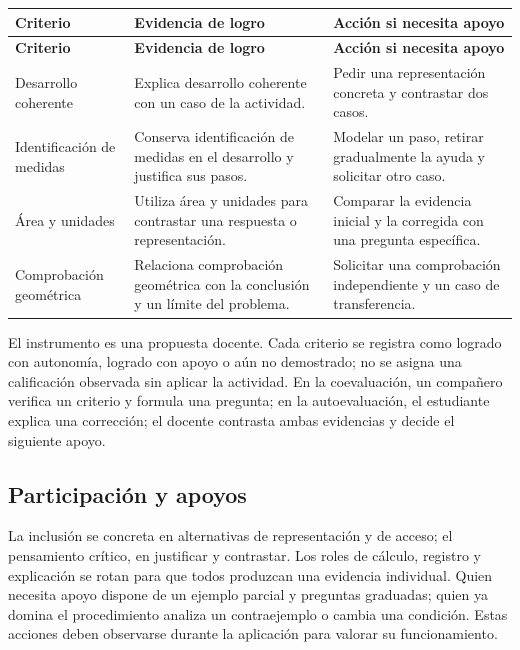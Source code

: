 \documentclass[spanish,letterpaper,oneside]{article}
\begin{document}
{\small{}\renewcommand{\arraystretch}{1.25}
\begin{longtable}{|>{\raggedright\arraybackslash}p{}|>{\raggedright\arraybackslash}p{}|>{\raggedright\arraybackslash}p{}|}\hline
\rowcolor{iiiepePale} \textbf{Criterio} & \textbf{Evidencia de logro} & \textbf{Acción si necesita apoyo} \\\hline
\endfirsthead
\hline
\rowcolor{iiiepePale} \textbf{Criterio} & \textbf{Evidencia de logro} & \textbf{Acción si necesita apoyo} \\\hline
\endhead
Desarrollo coherente & Explica desarrollo coherente con un caso de la actividad. & Pedir una representación concreta y contrastar dos casos. \\\hline
Identificación de medidas & Conserva identificación de medidas en el desarrollo y justifica sus pasos. & Modelar un paso, retirar gradualmente la ayuda y solicitar otro caso. \\\hline
Área y unidades & Utiliza área y unidades para contrastar una respuesta o representación. & Comparar la evidencia inicial y la corregida con una pregunta específica. \\\hline
Comprobación geométrica & Relaciona comprobación geométrica con la conclusión y un límite del problema. & Solicitar una comprobación independiente y un caso de transferencia. \\\hline
\end{longtable}}
El instrumento es una propuesta docente. Cada criterio se registra como logrado con autonomía, logrado con apoyo o aún no demostrado; no se asigna una calificación observada sin aplicar la actividad. En la coevaluación, un compañero verifica un criterio y formula una pregunta; en la autoevaluación, el estudiante explica una corrección; el docente contrasta ambas evidencias y decide el siguiente apoyo.\subsection{Participación y apoyos}
La inclusión se concreta en alternativas de representación y de acceso; el pensamiento crítico, en justificar y contrastar. Los roles de cálculo, registro y explicación se rotan para que todos produzcan una evidencia individual. Quien necesita apoyo dispone de un ejemplo parcial y preguntas graduadas; quien ya domina el procedimiento analiza un contraejemplo o cambia una condición. Estas acciones deben observarse durante la aplicación para valorar su funcionamiento.
\end{document}
